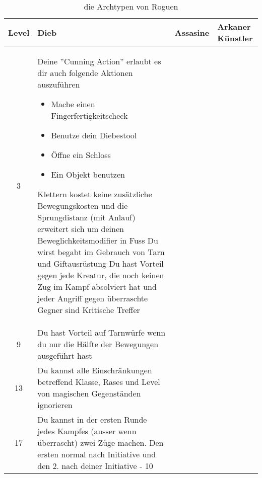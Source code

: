 \begin{table}
	\centering
	\begin{tabular}{cp{6cm}p{6cm}p{6cm}}
	\textbf{Level} & \textbf{Dieb} & \textbf{Assasine} &\textbf{Arkaner Künstler}\\ \hline
		
	3 &
	Deine ''Cunning Action'' erlaubt es dir auch folgende Aktionen auszuführen
	\begin{itemize}
		\item Mache einen Fingerfertigkeitscheck
		\item Benutze dein Diebestool
		\item Öffne ein Schloss
		\item Ein Objekt benutzen
	\end{itemize}		
	Klettern kostet keine zusätzliche Bewegungskosten und die Sprungdistanz (mit Anlauf) erweitert sich um deinen Beweglichkeitsmodifier in Fuss
	Du wirst begabt im Gebrauch von Tarn und Giftausrüstung \linebreak
	Du hast Vorteil gegen jede Kreatur, die noch keinen Zug im Kampf absolviert hat und jeder Angriff gegen überraschte Gegner sind Kritische Treffer&
	&
	\\ \hline
	
	9 &
	Du hast Vorteil auf Tarnwürfe wenn du nur die Hälfte der Bewegungen ausgeführt hast&
	&
	\\ \hline

	13 &
	Du kannst alle Einschränkungen betreffend Klasse, Rases und Level von magischen Gegenständen ignorieren&
	&
	\\ \hline
	
	17 &
	Du kannst in der ersten Runde jedes Kampfes (ausser wenn überrascht) zwei Züge machen. Den ersten normal nach Initiative und den 2. nach deiner Initiative - 10 &
	&
	\\ \hline
	\end{tabular}
	\caption{die Archtypen von Roguen}
\end{table}

